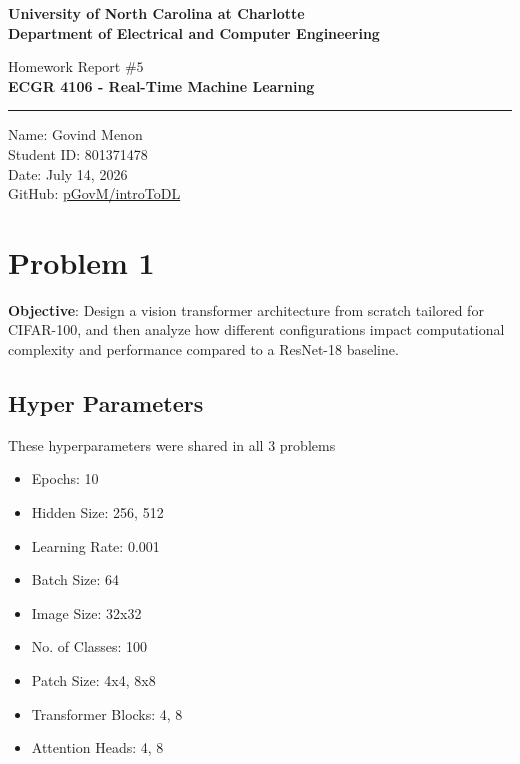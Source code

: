 \documentclass[a4paper]{article}
\begin{document}
\begin{titlepage}
    \thispagestyle{fancy}
    \renewcommand{\headrulewidth}{0pt}
    \begin{center}
        \vspace*{2cm}

        \LARGE\textbf{University of North Carolina at Charlotte\\
                        Department of Electrical and Computer Engineering}
        
        \vspace*{4cm}

        Homework Report $\# 5$ \\
        \Large\textbf{ECGR 4106 - Real-Time Machine Learning} \\
        
        \noindent\rule{14cm}{0.4pt}

        \vspace*{3cm}

        Name: Govind Menon \\
        Student ID: 801371478 \\
        Date: July 14, 2026 \\
        GitHub: \href{https://github.com/pGovm/introToDL.git}{pGovM/introToDL}

    \end{center}
\end{titlepage}

\section*{\textbf{Problem 1}}
\textbf{Objective}: Design a vision transformer architecture from scratch tailored for CIFAR-100, and then analyze how different configurations impact computational complexity and performance compared to a ResNet-18 baseline.

\subsection*{\textbf{\textbf{Hyper Parameters}}}
These hyperparameters were shared in all 3 problems 

\begin{itemize}
    \item Epochs: 10
    \item Hidden Size: 256, 512
    \item Learning Rate: 0.001
    \item Batch Size: 64
    \item Image Size: 32x32
    \item No. of Classes: 100
    \item Patch Size: 4x4, 8x8
    \item Transformer Blocks: 4, 8
    \item Attention Heads: 4, 8
\end{itemize}
\end{document}
